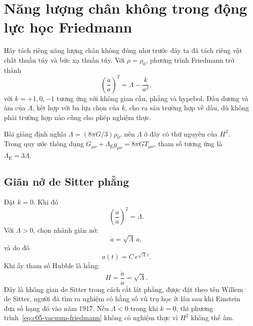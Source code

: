 \begin{classroomqa}
\end{classroomqa}

\section{Năng lượng chân không trong động lực học Friedmann}

Hãy tách riêng năng lượng chân không đúng như trước đây ta đã tách riêng vật chất thuần túy và bức xạ thuần túy. Với \(\rho=\rho_0\), phương trình Friedmann trở thành
\begin{equation}
\left(\frac{\dot a}{a}\right)^2=\Lambda-\frac{k}{a^2},
\label{eq:c05-vacuum-friedmann}
\end{equation}
với \(k=+1,0,-1\) tương ứng với không gian cầu, phẳng và hypebol. Dấu dương và âm của \(\Lambda\), kết hợp với ba lựa chọn của \(k\), cho ra sáu trường hợp về dấu, dù không phải trường hợp nào cũng cho phép nghiệm thực.

\begin{remark}
Bài giảng định nghĩa \(\Lambda=(8\pi G/3)\rho_0\), nên \(\Lambda\) ở đây có thứ nguyên của \(H^2\). Trong quy ước thông dụng \(G_{\mu\nu}+\Lambda_{\mathrm E}g_{\mu\nu}=8\pi G T_{\mu\nu}\), tham số tương ứng là \(\Lambda_{\mathrm E}=3\Lambda\).
\end{remark}

\subsection{Giãn nở de Sitter phẳng}

Đặt \(k=0\). Khi đó
\begin{equation}
\left(\frac{\dot a}{a}\right)^2=\Lambda.
\end{equation}
Với \(\Lambda>0\), chọn nhánh giãn nở:
\begin{equation}
\dot a=\sqrt{\Lambda}\,a,
\end{equation}
và do đó
\begin{equation}
a(t)=C\,e^{\sqrt{\Lambda}\,t}.
\end{equation}
Khi ấy tham số Hubble là hằng:
\begin{equation}
H=\frac{\dot a}{a}=\sqrt{\Lambda}.
\end{equation}
Đây là không gian de Sitter trong cách cắt lát phẳng, được đặt theo tên Willem de Sitter, người đã tìm ra nghiệm có hằng số vũ trụ học ít lâu sau khi Einstein đưa số hạng đó vào năm 1917. Nếu \(\Lambda<0\) trong khi \(k=0\), thì phương trình~\eqref{eq:c05-vacuum-friedmann} không có nghiệm thực vì \(H^2\) không thể âm.

